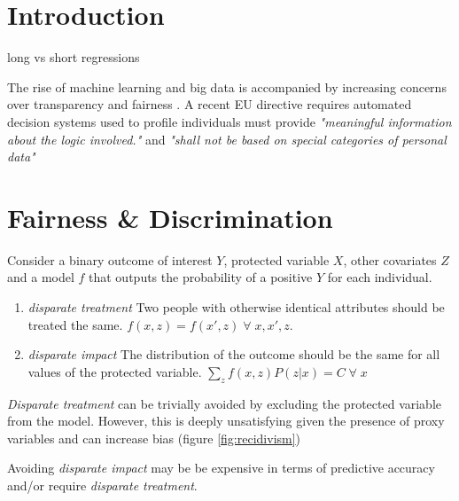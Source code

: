 \documentclass[a3,portrait,14pt]{sciposter}
\begin{document}
\begin{multicols}{2} %




\section*{Introduction}

long vs short regressions

The rise of machine learning and big data is accompanied by increasing concerns over transparency and fairness \cite{Barocas2014}. A recent EU directive requires automated decision systems used to profile individuals must provide \textit{"meaningful information about the logic involved."}  and \textit{"shall not be based on special categories of personal data"} \cite{Goodman2016}

\section*{Fairness \& Discrimination}
Consider a binary outcome of interest $Y$, protected variable $X$, other covariates $Z$ and a model $f$ that outputs the probability of a positive $Y$ for each individual.    
\begin{enumerate}
\item \textit{disparate treatment} Two people with otherwise identical attributes should be treated the same. $f(x,z) = f(x',z) \; \forall \; x,x',z$. 
\item \textit{disparate impact} The distribution of the outcome should be the same for all values of the protected variable. $\sum_z f(x,z)P(z|x) = C \; \forall \; x$
\end{enumerate}

\textit{Disparate treatment} can be trivially avoided by excluding the protected variable from the model. However, this is deeply unsatisfying given the presence of proxy variables and can increase bias (figure \ref{fig:recidivism})

Avoiding \textit{disparate impact} may be be expensive in terms of predictive accuracy and/or require \textit{disparate treatment}. 


\end{multicols}
\end{document}
